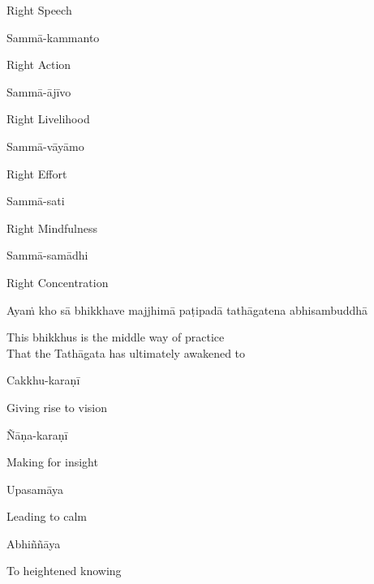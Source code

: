 \begin{english}
  Right Speech
\end{english}

Sammā-kammanto

\begin{english}
  Right Action
\end{english}

Sammā-ājīvo

\begin{english}
  Right Livelihood
\end{english}

Sammā-vāyāmo

\begin{english}
  Right Effort
\end{english}

Sammā-sati

\begin{english}
  Right Mindfulness
\end{english}

Sammā-samādhi

\begin{english}
  Right Concentration
\end{english}

\begin{pali-hang}
  Ayaṁ kho sā bhikkhave majjhimā paṭipadā tathāgatena abhisambuddhā
\end{pali-hang}

\begin{english}
  This bhikkhus is the middle way of practice\\
  That the Tathāgata has ultimately awakened to
\end{english}

\ifbfive\clearpage\fi

Cakkhu-karaṇī

\begin{english}
  Giving rise to vision
\end{english}

Ñāṇa-karaṇī

\begin{english}
  Making for insight
\end{english}

Upasamāya

\begin{english}
  Leading to calm
\end{english}

Abhiññāya

\begin{english}
  To heightened knowing
\end{english}

